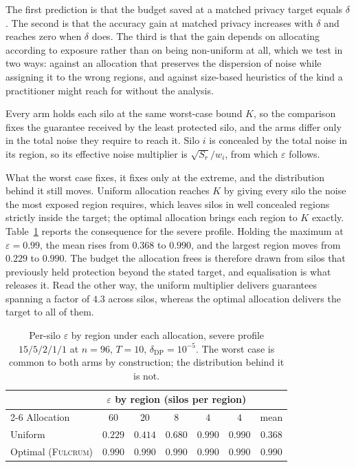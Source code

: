 \documentclass[acmsmall,screen,review,anonymous]{acmart}
\theoremstyle{acmdefinition}%
\newcommand{\Fulcrum}{\textsc{Fulcrum}\xspace}
\begin{document}
The first prediction is that the budget saved at a matched privacy target equals
$\delta$. The second is that the accuracy gain at matched privacy increases with
$\delta$ and reaches zero when $\delta$ does. The third is that the gain depends
on allocating according to exposure rather than on being non-uniform at all, which
we test in two ways: against an allocation that preserves the dispersion of noise
while assigning it to the wrong regions, and against size-based heuristics of the
kind a practitioner might reach for without the analysis.

Every arm holds each silo at the same worst-case bound $K$, so the comparison
fixes the guarantee received by the least protected silo, and the arms differ only
in the total noise they require to reach it. Silo $i$ is concealed by the total
noise in its region, so its effective noise multiplier is $\sqrt{S_r}/w_i$, from
which $\varepsilon$ follows.

What the worst case fixes, it fixes only at the extreme, and the distribution
behind it still moves. Uniform allocation reaches $K$ by giving every silo the
noise the most exposed region requires, which leaves silos in well concealed
regions strictly inside the target; the optimal allocation brings each region to
$K$ exactly. Table~\ref{tab:epsdist} reports the consequence for the severe
profile. Holding the maximum at $\varepsilon = 0.99$, the mean rises from $0.368$
to $0.990$, and the largest region moves from $0.229$ to $0.990$. The budget the
allocation frees is therefore drawn from silos that previously held protection
beyond the stated target, and equalisation is what releases it. Read the other
way, the uniform multiplier delivers guarantees spanning a factor of $4.3$ across
silos, whereas the optimal allocation delivers the target to all of them.

\begin{table}[t]
\caption{Per-silo $\varepsilon$ by region under each allocation, severe profile $15/5/2/1/1$ at $n = 96$, $T = 10$, $\delta_{\mathrm{DP}} = 10^{-5}$. The worst case is common to both arms by construction; the distribution behind it is not.}
\label{tab:epsdist}
\centering
\footnotesize
\setlength{\tabcolsep}{4pt}
\begin{tabular}{@{}lcccccc@{}}
\toprule
& \multicolumn{5}{c}{$\varepsilon$ by region (silos per region)} & \\
\cmidrule(lr){2-6}
Allocation & $60$ & $20$ & $8$ & $4$ & $4$ & mean \\
\midrule
Uniform            & $0.229$ & $0.414$ & $0.680$ & $0.990$ & $0.990$ & $0.368$ \\
Optimal (\Fulcrum) & $0.990$ & $0.990$ & $0.990$ & $0.990$ & $0.990$ & $0.990$ \\
\bottomrule
\end{tabular}
\end{table}
\end{document}
